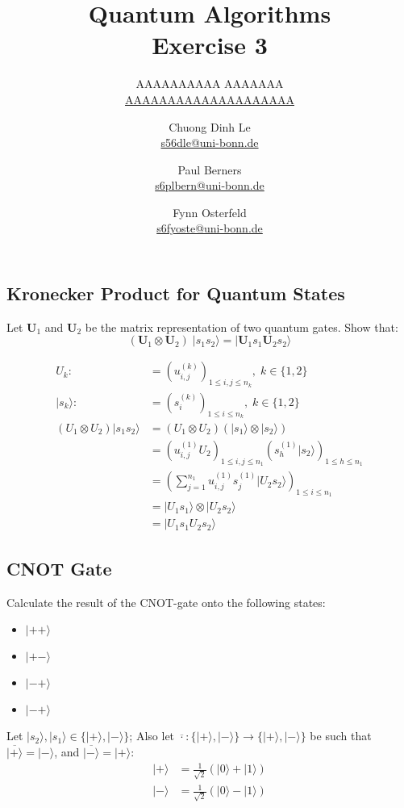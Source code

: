 \documentclass{article}
\title{Quantum Algorithms \\ Exercise 3}
\author{
  AAAAAAAAAA AAAAAAA \\ \href{mailto:AAAAAAAAAAAAAAAAAAAA}{AAAAAAAAAAAAAAAAAAAA} \and
  Chuong Dinh Le \\ \href{mailto:s56dle@uni-bonn.de}{s56dle@uni-bonn.de} \and
  Paul Berners \\ \href{mailto:s6plbern@uni-bonn.de}{s6plbern@uni-bonn.de} \and
  Fynn Osterfeld \\ \href{mailto:s6fyoste@uni-bonn.de}{s6fyoste@uni-bonn.de}
}
\begin{document}
  \maketitle

  \setcounter{section}{3}
  \subsection{Kronecker Product for Quantum States}
  \begin{centerframebox}
    Let $\mathbf{U}_1$ and $\mathbf{U}_2$ be the matrix representation of two quantum gates. Show that:
    \[ (\mathbf{U}_{1}\otimes\mathbf{U}_{2})\; |s_{1}s_{2}\rangle = |\mathbf{U}_{1}s_{1}\mathbf{U}_{2}s_{2}\rangle \]
  \end{centerframebox}

  \begin{align*}
      U_k :&= \left(u_{i, j}^{(k)}\right)_{1\leq i, j\leq n_k},\; k\in \{1, 2\}\\
      |s_k\rangle :&= \left(s_i^{(k)}\right)_{1\leq i \leq n_k},\; k\in \{1, 2\}\\
      (U_1 \otimes U_2)|s_1s_2\rangle &= (U_1 \otimes U_2)(|s_1\rangle \otimes |s_2\rangle)\\
      &= \left(u_{i, j}^{(1)}U_2\right)_{1\leq i, j\leq n_1}  \left(s_h^{(1)}|s_2\rangle\right)_{1\leq h\leq n_1}\\
      &= \left(\sum_{j=1}^{n_1}u_{i, j}^{(1)}s_j^{(1)}|U_2s_2\rangle\right)_{1\leq i\leq n_1}\\
      &= |U_1s_1\rangle \otimes |U_2s_2\rangle\\
      &= |U_1s_1U_2s_2\rangle
  \end{align*}

  \subsection{CNOT Gate}
  \begin{centerframebox}
    Calculate the result of the CNOT-gate onto the following states:
    \begin{itemize}
      \item $|++\rangle$
      \item $|+-\rangle$
      \item $|-+\rangle$
      \item $|-+\rangle$
    \end{itemize}
  \end{centerframebox}

  Let $|s_2\rangle, |s_1\rangle \in \{|+\rangle, |-\rangle\}$; Also let $\overline{\cdot}: \{|+\rangle, |-\rangle\} \rightarrow \{|+\rangle, |-\rangle\}$ be such that $\overline{|+\rangle} = |-\rangle$, and $\overline{|-\rangle} = |+\rangle$:
  \begin{align*}
    |+\rangle &= \frac{1}{\sqrt{2}}(|0\rangle + |1\rangle)\\
    |-\rangle &= \frac{1}{\sqrt{2}}(|0\rangle - |1\rangle)
  \end{align*}
\end{document}

